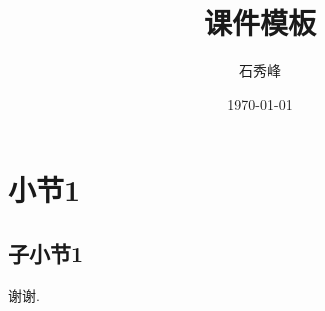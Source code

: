 \documentclass[UTF8,usenames,dvipsnames]{ctexbeamer}
\title{课件模板}
\date{\today}
\author{石秀峰}
\begin{document}
\maketitle

\section{小节1}

\subsection{子小节1}

\begin{frame}{\insertsubsection}

\end{frame}

\begin{frame}{\insertsubsection}

\begin{center}
\Huge 谢谢.
\end{center}
\end{frame}
\end{document}
